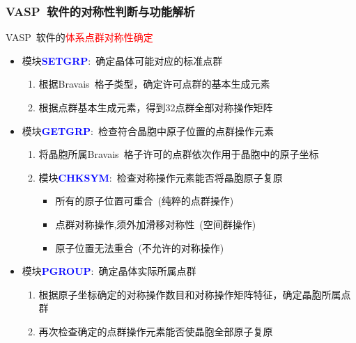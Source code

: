 \documentclass[cjk,slidestop,handout,compress,mathserif,blue]{beamer}	%
\begin{document}
\frame
{
	\frametitle{\textrm{VASP~}软件的对称性判断与功能解析}
	\textrm{VASP~}软件的\textcolor{red}{体系点群对称性确定}
	\begin{itemize}
		\item 模块\textcolor{blue}{\textbf{SETGRP}}:~确定晶体可能对应的标准点群
			\begin{enumerate}
				\item 根据\textrm{Bravais~}格子类型，确定许可点群的基本生成元素
				\item 根据点群基本生成元素，得到32点群全部对称操作矩阵
			\end{enumerate}
		\item 模块\textcolor{blue}{\textbf{GETGRP}}:~检查符合晶胞中原子位置的点群操作元素
			\begin{enumerate}
				\item 将晶胞所属\textrm{Bravais~}格子许可的点群依次作用于晶胞中的原子坐标
				\item 模块\textcolor{blue}{\textbf{CHKSYM}}:~检查对称操作元素能否将晶胞原子复原
			\begin{itemize}
				\item 所有的原子位置可重合~(纯粹的点群操作)
				\item 点群对称操作,须外加滑移对称性~(空间群操作)
				\item 原子位置无法重合~(不允许的对称操作)
			\end{itemize}
			\end{enumerate}
		\item 模块\textcolor{blue}{\textbf{PGROUP}}:~确定晶体实际所属点群
			\begin{enumerate}
				\item 根据原子坐标确定的对称操作数目和对称操作矩阵特征，确定晶胞所属点群
				\item 再次检查确定的点群操作元素能否使晶胞全部原子复原
			\end{enumerate}
	\end{itemize}
}

%
\end{document}
